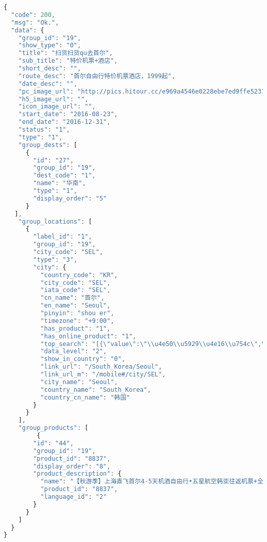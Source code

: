 \begin{lstlisting}[language=JavaScript]
{
  "code": 200,
  "msg": "Ok.",
  "data": {
    "group_id": "19",
    "show_type": "0",
    "title": "扫货扫货qu去首尔",
    "sub_title": "特价机票+酒店",
    "short_desc": "",
    "route_desc": "首尔自由行特价机票酒店，1999起",
    "date_desc": "",
    "pc_image_url": "http://pics.hitour.cc/e969a4546e0228ebe7ed9ffe52319962.png",
    "h5_image_url": "",
    "icon_image_url": "",
    "start_date": "2016-08-23",
    "end_date": "2016-12-31",
    "status": "1",
    "type": "1",
    "group_dests": [
      {
        "id": "27",
        "group_id": "19",
        "dest_code": "1",
        "name": "华南",
        "type": "1",
        "display_order": "5"
      }
   ],
    "group_locations": [
      {
        "label_id": "1",
        "group_id": "19",
        "city_code": "SEL",
        "type": "3",
        "city": {
          "country_code": "KR",
          "city_code": "SEL",
          "iata_code": "SEL",
          "cn_name": "首尔",
          "en_name": "Seoul",
          "pinyin": "shou er",
          "timezone": "+9:00",
          "has_product": "1",
          "has_online_product": "1",
          "top_search": "[{\"value\":\"\\u4e50\\u5929\\u4e16\\u754c\",\"display_order\":1},{\"value\":\"\\u6c11\\u4fd7\",\"display_order\":2},{\"value\":\"\\u4e71\\u6253\\u79c0\",\"display_order\":3},{\"value\":\"\\u660e\\u6d1e\",\"display_order\":4},{\"value\":\"\\u6c5d\\u77e3\\u5c9b\",\"display_order\":5},{\"value\":\"\\u4e1c\\u5927\\u95e8\",\"display_order\":6}]",
          "data_level": "2",
          "show_in_country": "0",
          "link_url": "/South_Korea/Seoul",
          "link_url_m": "/mobile#/city/SEL",
          "city_name": "Seoul",
          "country_name": "South_Korea",
          "country_cn_name": "韩国"
        }
      }
    ],
    "group_products": [
         {
        "id": "44",
        "group_id": "19",
        "product_id": "8837",
        "display_order": "8",
        "product_description": {
          "name": "【秋游季】上海直飞首尔4-5天机酒自由行•五星航空韩亚往返机票+全程热销酒店套餐任选 赠接机半日游/首尔1日游/自由行大礼包",
          "product_id": "8837",
          "language_id": "2"
        }
      }
    ]
  }
}
\end{lstlisting}


